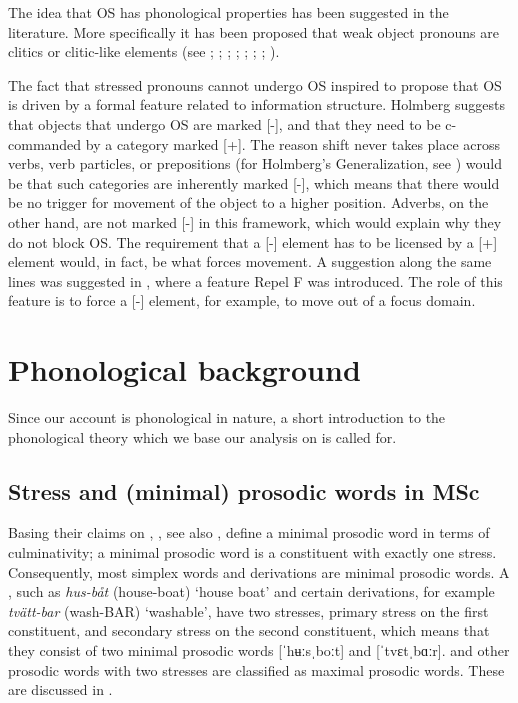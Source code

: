 \documentclass[output=paper]{LSP/langsci}
\begin{document}
The idea that OS has phonological properties has been suggested in the literature. More specifically it has been proposed that weak object pronouns are clitics or clitic-like elements (see \citealt[167]{Holmberg1991}; \citealt{Josefsson1992,Josefsson1993,Josefsson1994,Josefsson2010,Josefsson2012}; \citealt[122]{Déprez1994}; \citealt{Hellan1994,Hellan2005}; \citealt[207]{BobaljikJonas1996}; \citealt[77]{Diesing1996kluwer}; \citealt[41]{Diesing1997}; \citealt{Erteschik-Shir2005Sound,Erteschik-Shir2005WhatIs,Hosono2010,Hosono2013}). 

The fact that stressed pronouns cannot undergo OS inspired \citet[25–28]{Holmberg1999} to propose that OS is driven by a formal feature related to information structure. Holmberg suggests that objects that undergo OS are marked [-], and that they need to be c-commanded by a category marked  [+]. The reason shift never takes place across verbs, verb particles, or prepositions (for Holmberg’s Generalization, see \citealt{Holmberg1986,Holmberg1999}) would be that such categories are inherently marked [-], which means that there would be no trigger for movement of the object to a higher position.  Adverbs, on the other hand, are not marked [-] in this framework, which would explain why they do not block OS. The requirement that a [-] element has to be licensed by a [+] element would, in fact, be what forces movement. A suggestion along the same lines was suggested in \citet{Platzack1996}, where a feature Repel F was introduced. The role of this feature is to {force} a [-] element, for example, to move out of a focus domain.

\section{Phonological background}\label{sec:erteschik:3}

Since our account is phonological in nature, a short introduction to the phonological theory  which we base our analysis on is called for. 

\subsection{ Stress and (minimal) prosodic words in MSc}\label{sec:erteschik:3.1}

Basing their claims on , \citet{Myrberg2013}, see also \citet{Riad2013}, define a minimal prosodic word in terms of culminativity; a minimal prosodic word is a constituent with exactly one stress. Consequently, most simplex words and derivations are minimal prosodic words. A , such as \textit{hus-båt} (house-boat) ‘house boat’ and certain derivations, for example \textit{tvätt-bar} (wash-BAR) ‘washable’, have two stresses, primary stress on the first constituent, and secondary stress on the second constituent, which means that they consist of two minimal prosodic words [ˈhʉːsˌboːt] and [ˈtvɛtˌbɑːr].  and other prosodic words with two stresses are classified as maximal prosodic words. These are discussed in .
\end{document}
